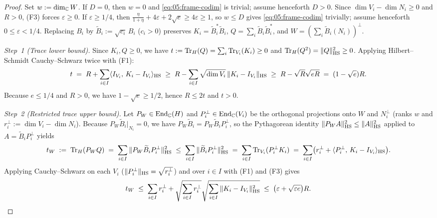 \begin{proof}
Set $w := \dim_{\mathbb{C}} W$. If $D = 0$, then $w = 0$ and \eqref{eq:05:frame-codim} is trivial; assume henceforth $D > 0$. Since $\dim V_i - \dim N_i \ge 0$ and $R > 0$, (F3) forces $\varepsilon \ge 0$. If $\varepsilon \ge 1/4$, then $\frac{\eta}{1+\eta} + 4\varepsilon + 2\sqrt{e} \ge 4\varepsilon \ge 1$, so $w \le D$ gives \eqref{eq:05:frame-codim} trivially; assume henceforth $0 \le \varepsilon < 1/4$. Replacing $B_i$ by $\widetilde{B}_i := \sqrt{c_i}\, B_i$ ($c_i > 0$) preserves $K_i = \widetilde{B}_i^* \widetilde{B}_i$, $Q = \sum_i \widetilde{B}_i \widetilde{B}_i^*$, and $W = (\sum_i \widetilde{B}_i(N_i))^\perp$.

\emph{Step~1 (Trace lower bound).} Since $K_i, Q \ge 0$, we have $t := \operatorname{Tr}_H(Q) = \sum_i \operatorname{Tr}_{V_i}(K_i) \ge 0$ and $\operatorname{Tr}_H(Q^2) = \|Q\|_{\mathrm{HS}}^2 \ge 0$. Applying Hilbert--Schmidt Cauchy--Schwarz twice with (F1):
\[
  t \;=\; R + \sum_{i \in I} \langle I_{V_i},\, K_i - I_{V_i}\rangle_{\mathrm{HS}}
  \;\ge\; R - \sum_{i \in I} \sqrt{\dim V_i}\,\|K_i - I_{V_i}\|_{\mathrm{HS}}
  \;\ge\; R - \sqrt{R}\sqrt{e R} \;=\; (1 - \sqrt{e}) R.
\]
Because $e \le 1/4$ and $R > 0$, we have $1 - \sqrt{e} \ge 1/2$, hence $R \le 2t$ and $t > 0$.

\emph{Step~2 (Restricted trace upper bound).} Let $P_W \in \mathrm{End}_{\mathbb{C}}(H)$ and $P_i^\perp \in \mathrm{End}_{\mathbb{C}}(V_i)$ be the orthogonal projections onto $W$ and $N_i^\perp$ (ranks $w$ and $r_i^\perp := \dim V_i - \dim N_i$). Because $P_W \widetilde{B}_i|_{N_i} = 0$, we have $P_W \widetilde{B}_i = P_W \widetilde{B}_i P_i^\perp$, so the Pythagorean identity $\|P_W A\|_{\mathrm{HS}}^2 \le \|A\|_{\mathrm{HS}}^2$ applied to $A = \widetilde{B}_i P_i^\perp$ yields
\[
  t_W \;:=\; \operatorname{Tr}_H(P_W Q) \;=\; \sum_{i \in I} \|P_W \widetilde{B}_i P_i^\perp\|_{\mathrm{HS}}^2
  \;\le\; \sum_{i \in I} \|\widetilde{B}_i P_i^\perp\|_{\mathrm{HS}}^2
  \;=\; \sum_{i \in I} \operatorname{Tr}_{V_i}(P_i^\perp K_i)
  \;=\; \sum_{i \in I} \bigl(r_i^\perp + \langle P_i^\perp,\, K_i - I_{V_i}\rangle_{\mathrm{HS}}\bigr).
\]
Applying Cauchy--Schwarz on each $V_i$ ($\|P_i^\perp\|_{\mathrm{HS}} = \sqrt{r_i^\perp}$) and over $i \in I$ with (F1) and (F3) gives
\[
  t_W \;\le\; \sum_{i \in I} r_i^\perp + \sqrt{\sum_{i \in I} r_i^\perp}\sqrt{\sum_{i \in I} \|K_i - I_{V_i}\|_{\mathrm{HS}}^2}
  \;\le\; \bigl(\varepsilon + \sqrt{\varepsilon e}\bigr) R.
\]


\end{proof}
